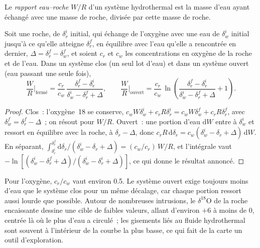 \begin{definition}\label{def:b3:water-rock-interaction:water-rock-ratio}
Le \emph{rapport eau--roche} $W/R$ d'un
système hydrothermal est la masse d'eau ayant échangé avec une masse de
roche, divisée par cette masse de roche.
\end{definition}

\begin{proposition}\label{prop:b3:water-rock-interaction:wr}
Soit une roche, de $\delta_r^i$ initial, qui échange de l'oxygène avec une eau de
$\delta_w^i$ initial jusqu'à ce qu'elle atteigne $\delta_r^f$, en équilibre avec l'eau
qu'elle a rencontrée en dernier, $\Delta = \delta_r^f - \delta_w^f$, et soient $c_r$ et $c_w$ les
concentrations en oxygène de la roche et de l'eau. Dans un système clos (un seul lot
d'eau) et dans un système ouvert (eau passant une seule fois),
\[
\frac WR\Big|_{\text{fermé}} = \frac{c_r}{c_w}\,
\frac{\delta_r^f - \delta_r^i}{\delta_w^i - \delta_r^f + \Delta},
\qquad
\frac WR\Big|_{\text{ouvert}} = \frac{c_r}{c_w}\,
\ln\!\left(\frac{\delta_r^f - \delta_r^i}{\delta_w^i - \delta_r^f + \Delta} + 1\right).
\]
\end{proposition}

\begin{proof}
Clos~: l'oxygène~18 se conserve, $c_wW\delta_w^i + c_rR\delta_r^i = c_wW
\delta_w^f + c_rR\delta_r^f$, avec $\delta_w^f = \delta_r^f - \Delta$~; on résout
pour $W/R$. Ouvert~: une portion d'eau $\mathrm dW$ entre à $\delta_w^i$ et ressort en
équilibre avec la roche, à $\delta_r - \Delta$, donc $c_rR\,\mathrm d\delta_r
= c_w(\delta_w^i - \delta_r + \Delta)\,\mathrm dW$. En séparant,
$\int_{\delta_r^i}^{\delta_r^f}\mathrm d\delta_r/(\delta_w^i - \delta_r +
\Delta) = (c_w/c_r)\,W/R$, et l'intégrale vaut $-\ln[(\delta_w^i - \delta_r^f
+ \Delta)/(\delta_w^i - \delta_r^i + \Delta)]$, ce qui donne le résultat annoncé.
\end{proof}

Pour l'oxygène, $c_r/c_w$ vaut environ 0.5. Le système ouvert exige toujours moins
d'eau que le système clos pour un même décalage, car chaque portion ressort
aussi lourde que possible. Autour de nombreuses intrusions, le $\delta^{18}\mathrm O$ de la
roche encaissante dessine une cible de faibles valeurs, allant d'environ $+6$ à
moins de 0, centrée là où le plus d'eau a circulé~; les gisements liés au fluide hydrothermal
sont souvent à l'intérieur de la courbe la plus basse, ce qui fait de la carte un
outil d'exploration.

